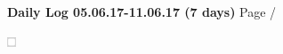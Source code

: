 \noindent \large{\textbf{Daily Log 05.06.17-11.06.17 (7 days)}} \hfill \small{Page \thepage/\pageref{LastPage}}

\vspace{0.5em}
\centerline{\includegraphics{legendSymbols.pdf}}
\vspace{0.1em}